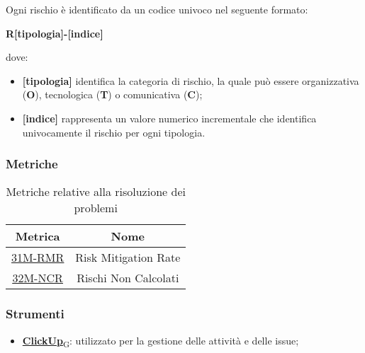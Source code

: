 Ogni rischio è identificato da un codice univoco nel seguente formato:
\begin{center}
	\textbf{R[tipologia]-[indice]}
\end{center}
dove:
\begin{itemize}
	\item \textbf{[tipologia]} identifica la categoria di rischio, la quale può essere organizzativa (\textbf{O}), tecnologica (\textbf{T}) o comunicativa (\textbf{C});
	\item \textbf{[indice]} rappresenta un valore numerico incrementale che identifica univocamente il rischio per ogni tipologia.
\end{itemize}

\newpage
\subsubsection{Metriche}
\begin{table}[h]
	\centering
	\begin{tabular}{|c|c|}
		\hline
		\textbf{Metrica} & \textbf{Nome}        						\\
		\hline
		\underline{\hyperlink{31M}{31M-RMR}}   &  Risk Mitigation Rate  \\
		\underline{\hyperlink{32M}{32M-NCR}}   &  Rischi Non Calcolati  \\
		\hline
	\end{tabular}
	\caption{Metriche relative alla risoluzione dei problemi}
\end{table}

\subsubsection{Strumenti}
\begin{itemize}
	\item \href{https://7last.github.io/docs/pb/documentazione-interna/glossario\#clickup}{\textbf{ClickUp}\textsubscript{G}}: utilizzato per la gestione delle attività e delle issue;
\end{itemize}
